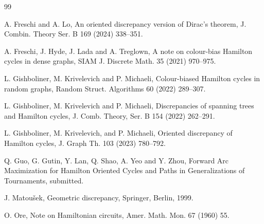 \documentclass[11pt]{article}
\newcommand{\2}{\vspace{0.2cm}}
\begin{document}
\begin{thebibliography}{99}
{ A. Freschi and  A. Lo, An oriented discrepancy version of Dirac’s theorem,  J. Combin. Theory Ser. B 169 (2024) 338--351.

 A. Freschi, J. Hyde, J. Lada and A. Treglown, A note on colour-bias Hamilton cycles in dense graphs, SIAM J. Discrete Math. 35 (2021) 970--975.


 L. Gishboliner, M. Krivelevich and P. Michaeli, Colour-biased Hamilton cycles in random graphs, Random Struct. Algorithms 60 (2022) 289--307.

 L. Gishboliner, M. Krivelevich and P. Michaeli, Discrepancies of spanning trees and Hamilton cycles, J. Comb. Theory, Ser. B 154 (2022) 262--291.

 L. Gishboliner, M. Krivelevich, and P. Michaeli, Oriented discrepancy of Hamilton cycles, J. Graph Th. 103 (2023) 780--792.






 Q. Guo, G. Gutin, Y. Lan, Q. Shao, A. Yeo and Y. Zhou,  Forward Arc Maximization for Hamilton Oriented Cycles and Paths in Generalizations of Tournaments, submitted. %

 J. Matou{\v s}ek, Geometric discrepancy, Springer, Berlin, 1999.


 O. Ore, Note on Hamiltonian circuits, Amer. Math. Mon. 67 (1960) 55.


}
\end{thebibliography}
\end{document}
